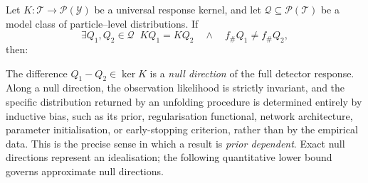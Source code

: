 \documentclass[12pt]{article}
\newcommand{\Prb}{\mathbb{P}}
\newcommand{\KL}{D_{\mathrm{KL}}}
\newcommand{\Meas}{\mathcal{P}}
\newcommand{\1}{\mathbbm{1}}
\newcommand{\pushf}[1]{#1_{\#}}
\renewcommand{\[}{\begin{equation}}
\renewcommand{\]}{\end{equation}}
\begin{document}
\begin{theorem}
    \label{thm:non-identifiable}
        Let \(K \colon \mathcal{T} \to \Meas(\mathcal{Y})\) be a universal response kernel, and let \(\mathcal{Q} \subseteq \Meas(\mathcal{T})\) be a model class of particle--level distributions.
        If
        \begin{equation}
        \label{eq:null-direction}
            \exists Q_1, Q_2 \in \mathcal{Q} \;\; KQ_1 = KQ_2 \quad \land \quad \pushf fQ_1 \ne \pushf fQ_2,
        \end{equation}
        then:
    \end{theorem}

    The difference \(Q_1-Q_2\in\ker K\) is a \emph{null direction} of the full detector response.
    Along a null direction, the observation likelihood is strictly invariant, and the specific distribution returned by an unfolding procedure is determined entirely by inductive bias, such as its prior, regularisation functional, network architecture, parameter initialisation, or early-stopping criterion, rather than by the empirical data.
    This is the precise sense in which a result is \emph{prior dependent}.
    Exact null directions represent an idealisation; the following quantitative lower bound governs approximate null directions.
\end{document}
